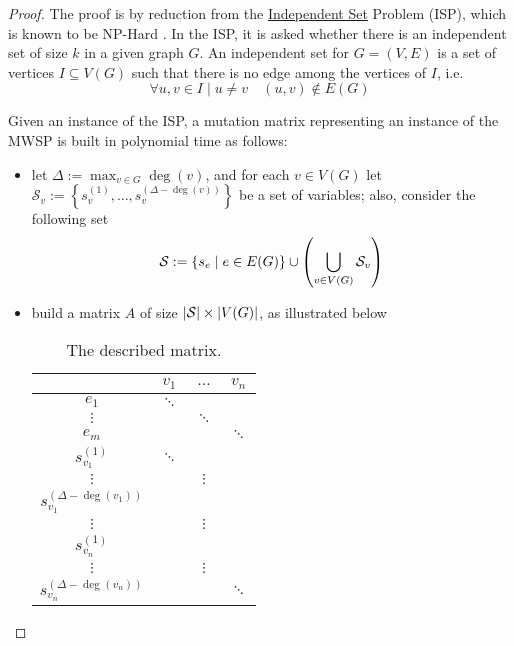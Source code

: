 \begin{proof}
        The proof is by reduction from the \href{https://en.wikipedia.org/wiki/Independent_set_(graph_theory)}{Independent Set} Problem (ISP), which is known to be NP-Hard \cite{hochbaum}. In the ISP, it is asked whether there is an independent set of size $k$ in a given graph $G$. An independent set for $G = (V, E)$ is a set of vertices $I \subseteq V(G)$ such that there is no edge among the vertices of $I$, i.e. $$\forall u, v \in I \mid u \neq v \quad (u, v) \notin E(G)$$

        Given an instance of the ISP, a mutation matrix representing an instance of the MWSP is built in polynomial time as follows:

        \begin{itemize}
            \item let $\Delta := \max_{v \in G}{\deg(v)}$, and for each $v \in V(G)$ let $\mathcal S_v := \left\{s_v^{(1)}, \ldots, s_v^{(\Delta - \deg(v))}\right\}$ be a set of variables; also, consider the following set $$\mathcal S := \left\{s_e \mid e \in E(G)\right\} \cup \left(\bigcup_{v \in V(G)}{\mathcal S_v}\right)$$
            \item build a matrix $A$ of size $\left|\mathcal S\right| \times \left|V(G)\right|$, as illustrated below

                \begin{table}[H]
                    \centering
                    \begin{tabular}{c|ccc}
                              & $v_1$ & $\ldots$ & $v_n$ \\
                        \hline
                        $e_1$ & $\ddots$ & & \\
                        $\vdots$ & & $\ddots$ & \\
                        $e_m$ & & & $\ddots$ \\
                        \hline
                        $s_{v_1}^{(1)}$ & $\ddots$ & & \\
                        $\vdots$ & & $\vdots$ & \\
                        $s_{v_1}^{(\Delta - \deg(v_1))}$ & &  & \\
                        $\vdots$ & & $\vdots$ & \\
                        $s_{v_n}^{(1)}$ & &  & \\
                        $\vdots$ & & $\vdots$ & \\
                        $s_{v_n}^{(\Delta - \deg(v_n))}$ & & & $\ddots$
                    \end{tabular}
                    \caption{The described matrix.}
                \end{table}


\end{itemize}
\end{proof}
